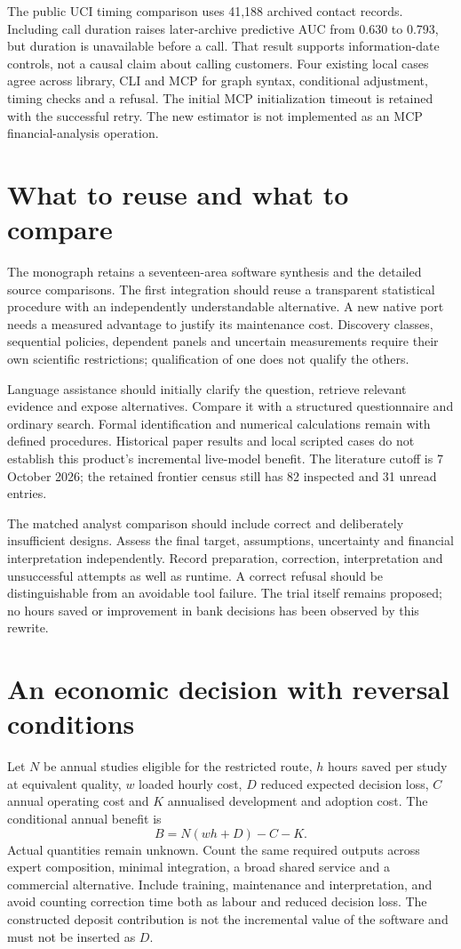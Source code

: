 \documentclass[11pt,a4paper,openany]{book}
\begin{document}
The public UCI timing comparison uses 41,188 archived contact records.
Including call duration raises later-archive predictive AUC from 0.630 to
0.793, but duration is unavailable before a call. That result supports
information-date controls, not a causal claim about calling customers.
Four existing local cases agree across library, CLI and MCP for graph
syntax, conditional adjustment, timing checks and a refusal. The initial
MCP initialization timeout is retained with the successful retry. The
new estimator is not implemented as an MCP financial-analysis operation.

\section*{What to reuse and what to compare}
The monograph retains a seventeen-area software synthesis and the detailed
source comparisons. The first integration should reuse a transparent
statistical procedure with an independently understandable alternative.
A new native port needs a measured advantage to justify its maintenance
cost. Discovery classes, sequential policies, dependent panels and uncertain
measurements require their own scientific restrictions; qualification of
one does not qualify the others.

Language assistance should initially clarify the question, retrieve relevant
evidence and expose alternatives. Compare it with a structured questionnaire
and ordinary search. Formal identification and numerical calculations remain
with defined procedures. Historical paper results and local scripted cases
do not establish this product's incremental live-model benefit. The
literature cutoff is 7 October 2026; the retained frontier census still has
82 inspected and 31 unread entries.

The matched analyst comparison should include correct and deliberately
insufficient designs. Assess the final target, assumptions, uncertainty and
financial interpretation independently. Record preparation, correction,
interpretation and unsuccessful attempts as well as runtime. A correct
refusal should be distinguishable from an avoidable tool failure. The trial
itself remains proposed; no hours saved or improvement in bank decisions
has been observed by this rewrite.

\section*{An economic decision with reversal conditions}
Let $N$ be annual studies eligible for the restricted route, $h$ hours saved
per study at equivalent quality, $w$ loaded hourly cost, $D$ reduced expected
decision loss, $C$ annual operating cost and $K$ annualised development and
adoption cost. The conditional annual benefit is
\[ B=N(wh+D)-C-K. \]
Actual quantities remain unknown. Count the same required outputs across
expert composition, minimal integration, a broad shared service and a
commercial alternative. Include training, maintenance and interpretation,
and avoid counting correction time both as labour and reduced decision loss.
The constructed deposit contribution is not the incremental value of the
software and must not be inserted as $D$.
\end{document}
